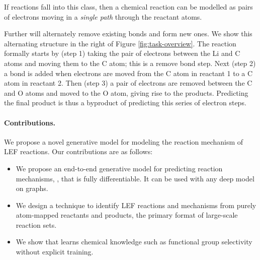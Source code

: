 If reactions fall into this class, then a chemical reaction can be modelled as pairs of electrons moving in a \emph{single path} through the reactant atoms. 

Further  will alternately remove existing bonds and form new ones. 
We show this alternating structure in the right of Figure \ref{fig:task-overview}. 
The reaction formally starts by (step 1) taking the pair of electrons between the Li and C atoms and moving them to the C atom; this is a remove bond step. 
Next (step 2) a bond is added when electrons are moved from the C atom in reactant 1 to a C atom in reactant 2.
Then (step 3) a pair of electrons are removed between the C and O atoms and moved to the O atom, giving rise to the products. 
Predicting the final product is thus a byproduct of predicting this series of electron steps.


\paragraph{Contributions.} We propose a novel generative model for modeling the reaction mechanism of LEF reactions. Our contributions are as follows:
\begin{itemize}
\item We propose an end-to-end generative model for predicting reaction mechanisms, \ourModelR, that is fully differentiable. It can be used with any deep model on graphs.
\item We design a technique to identify LEF reactions and mechanisms from purely atom-mapped reactants and products, the primary format of large-scale reaction sets.
\item We show that \ourModelR learns chemical knowledge such as functional group selectivity without explicit training.
\end{itemize}


